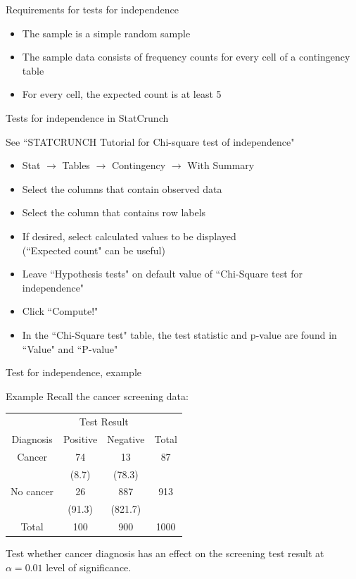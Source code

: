 \documentclass[xcolor=table]{beamer}
\begin{document}
\begin{frame}{Requirements for tests for independence}
\begin{block}{}
\large
\begin{itemize}
\item The sample is a simple random sample
\pause\item The sample data consists of frequency counts for every cell of a contingency table
\pause\item For every cell, the expected count is at least 5 
\end{itemize}
\end{block}
\end{frame}

\begin{frame}{Tests for independence in StatCrunch}
\begin{alertblock}{}
See ``STATCRUNCH Tutorial for Chi-square test of independence"
\end{alertblock}

\begin{block}{}
\begin{itemize}
\item Stat $\to$ Tables $\to$ Contingency $\to$ With Summary
\item Select the columns that contain observed data
\item Select the column that contains row labels
\item If desired, select calculated values to be displayed\\(``Expected count" can be useful)
\item Leave ``Hypothesis tests" on default value of ``Chi-Square test for independence"
\item Click ``Compute!"
\item In the ``Chi-Square test" table, the test statistic and p-value are found in ``Value" and ``P-value"
\end{itemize}
\end{block}

\end{frame}

\begin{frame}{Test for independence, example}
\begin{exampleblock}{Example}
Recall the cancer screening data:\\
\smallskip
{\centering
\begin{tabular}{c | c  c | c}
\multicolumn{1}{c}{} & \multicolumn{2}{c}{Test Result}\\
Diagnosis & Positive & Negative & Total\\
\hline
Cancer & 74 & 13 & 87\\
& (8.7) & (78.3)\\
No cancer & 26 & 887 & 913 \\
& (91.3) & (821.7)\\
\hline
Total & 100 & 900 & 1000
\end{tabular}
\par}
\bigskip
Test whether cancer diagnosis has an effect on the screening test result at $\alpha = 0.01$ level of significance.
\end{exampleblock}
\end{frame}
\end{document}
